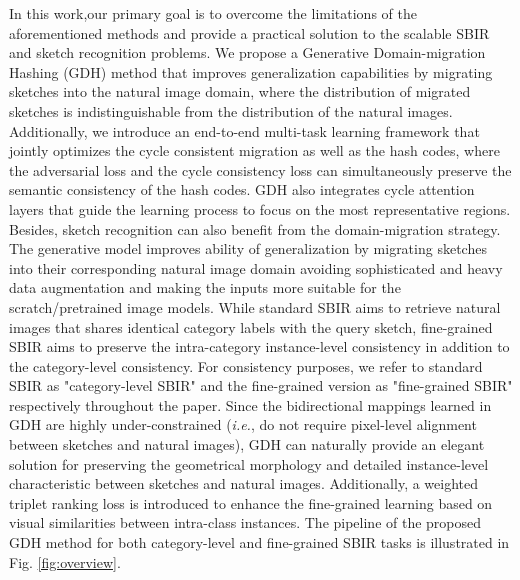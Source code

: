 In this work,our primary goal is to overcome the limitations of the aforementioned methods and provide a practical solution to the scalable SBIR and sketch recognition problems.
We propose a Generative Domain-migration Hashing (GDH) method that improves generalization capabilities by migrating sketches into the natural image domain, 
where the distribution of migrated sketches is indistinguishable from the distribution of the natural images. Additionally, 
we introduce an end-to-end multi-task learning framework that jointly optimizes 
the cycle consistent migration as well as the hash codes, where the adversarial 
loss and the cycle consistency loss can simultaneously preserve the semantic consistency of the hash codes. 
GDH also integrates cycle attention layers that guide the learning process to focus on the most representative regions.
Besides, sketch recognition can also benefit from the domain-migration strategy. 
The generative model improves ability of generalization by migrating sketches into 
their corresponding natural image domain avoiding sophisticated and heavy data augmentation 
and making the inputs more suitable for the scratch/pretrained image models.
While standard SBIR aims to retrieve natural images that shares identical category 
labels with the query sketch, fine-grained SBIR aims to preserve the intra-category 
instance-level consistency in addition to the category-level consistency. For 
consistency purposes, we refer to standard SBIR as "category-level SBIR" and the 
fine-grained version as "fine-grained SBIR" respectively throughout the paper. 
Since the bidirectional mappings learned in GDH are highly under-constrained 
(\emph{i.e.}, do not require pixel-level alignment \cite{IsolaZZE17} between 
sketches and natural images), GDH can naturally provide an elegant solution 
for preserving the geometrical morphology and detailed instance-level characteristic 
between sketches and natural images. Additionally, a weighted triplet ranking loss is introduced 
to enhance the fine-grained learning based on visual similarities between intra-class instances.
The pipeline of the proposed GDH method for both category-level and fine-grained SBIR tasks
is illustrated in Fig. \ref{fig:overview}. 

